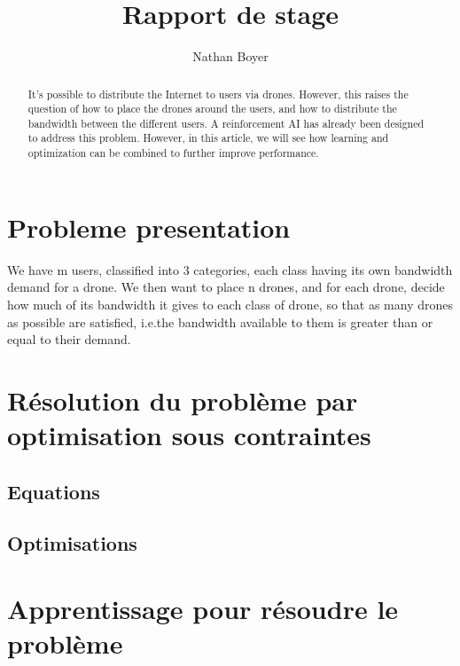 \documentclass[letterpaper]{article}
\title{Rapport de stage}
\author{Nathan Boyer}
\begin{document}
\maketitle


\begin{multicols}{2}
    


\begin{abstract}
    
    It's possible to distribute the Internet to users via drones.
    However, this raises the question of how to place the drones around the users, and how to distribute the bandwidth between the different users.
    A reinforcement AI has already been designed to address this problem.
    However, in this article, we will see how learning and optimization can be combined to further improve performance.

\end{abstract}


\section{Probleme presentation}

We have m users, classified into 3 categories, each class having its own bandwidth demand for a drone.
We then want to place n drones, and for each drone, decide how much of its bandwidth it gives to each class of drone, so that as many drones as possible are satisfied, i.e.\:the bandwidth available to them is greater than or equal to their demand.

\section{Résolution du problème par optimisation sous contraintes}

\subsection{Equations}

\subsection{Optimisations}

\section{Apprentissage pour résoudre le problème}


\end{multicols}
\end{document}
